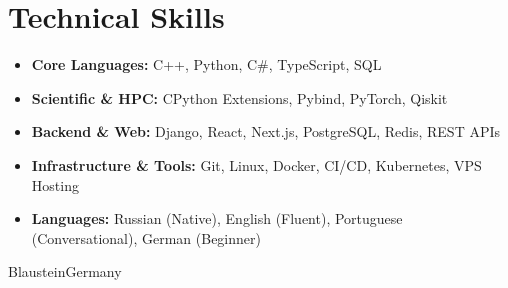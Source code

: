 \documentclass[11pt,a4paper,sans]{moderncv}
\begin{document}
	\section{Technical Skills}
	\begin{itemize}
		\item \textbf{Core Languages:} C++, Python, C\#, TypeScript, SQL
		\item \textbf{Scientific \& HPC:} CPython Extensions, Pybind, PyTorch, Qiskit
		\item \textbf{Backend \& Web:} Django, React, Next.js, PostgreSQL, Redis, REST APIs
		\item \textbf{Infrastructure \& Tools:} Git, Linux, Docker, CI/CD, Kubernetes, VPS Hosting
		\item \textbf{Languages:} Russian (Native), English (Fluent), Portuguese (Conversational), German (Beginner)
	\end{itemize}
	
	\vspace*{0.2cm}
	\name{}{}
	\title{}
	\address{Erhard-Grözinger-Straße, 75}{Blaustein}{Germany}
	\makecvtitle
\end{document}
